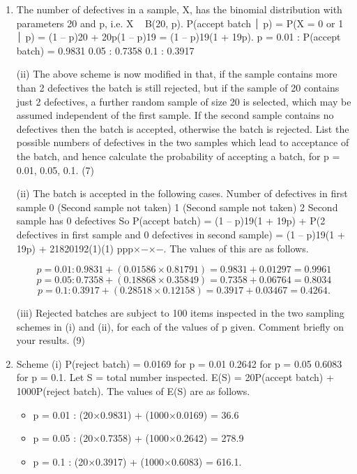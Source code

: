 \documentclass[a4paper,12pt]{article}
\begin{document}
\begin{enumerate}
\item The number of defectives in a sample, X, has the binomial distribution with parameters 20 and p, i.e. X ~ B(20, p).
P(accept batch ⏐ p) = P(X = 0 or 1 ⏐ p) = (1 – p)20 + 20p(1 – p)19
= (1 – p)19(1 + 19p).
p = 0.01 : P(accept batch) = 0.9831
0.05 : 0.7358
0.1 : 0.3917

\begin{framed}
(ii)
The above scheme is now modified in that, if the sample contains more than 2 defectives the batch is still rejected, but if the sample of 20 contains just 2
defectives, a further random sample of size 20 is selected, which may be assumed independent of the first sample. If the second sample contains no
defectives then the batch is accepted, otherwise the batch is rejected. List the possible numbers of defectives in the two samples which lead to
acceptance of the batch, and hence calculate the probability of accepting a batch, for p = 0.01, 0.05, 0.1.
(7)
\end{framed}
(ii) The batch is accepted in the following cases.
Number of defectives in first sample
0
(Second sample not taken)
1
(Second sample not taken)
2
Second sample has 0 defectives
So P(accept batch)
= (1 – p)19(1 + 19p)
+ P(2 defectives in first sample and 0 defectives in second sample)
= (1 – p)19(1 + 19p) + 21820192(1)(1) ppp×−×−.
The values of this are as follows.

\[p = 0.01 : 0.9831 + (0.01586×0.81791) = 0.9831 + 0.01297 = 0.9961\]
\[p = 0.05 : 0.7358 + (0.18868×0.35849) = 0.7358 + 0.06764 = 0.8034\]
\[p = 0.1 : 0.3917 + (0.28518×0.12158) = 0.3917 + 0.03467 = 0.4264.\]

\begin{framed}

(iii)
Rejected batches are subject to 100%
items inspected in the two sampling schemes in (i) and (ii), for each of the values of p given. Comment briefly on your results.
(9)
\end{framed}

\item 
Scheme (i) P(reject batch) = 0.0169 for p = 0.01
0.2642 for p = 0.05
0.6083 for p = 0.1.
Let S = total number inspected. E(S) = 20P(accept batch) + 1000P(reject batch).
The values of E(S) are as follows.
\begin{itemize}
\item p = 0.01 : (20×0.9831) + (1000×0.0169) = 36.6
\item p = 0.05 : (20×0.7358) + (1000×0.2642) = 278.9
\item p = 0.1 : (20×0.3917) + (1000×0.6083) = 616.1.
\end{itemize}


\end{enumerate}
\end{document}
